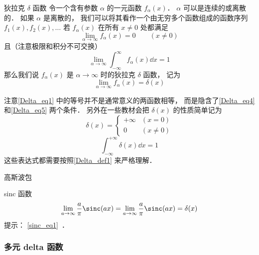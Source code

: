 \begin{definition}{狄拉克 $\delta$ 函数}\label{Delta_def1}
令一个含有参数 $\alpha$ 的一元函数 $f_\alpha(x)$． $\alpha$ 可以是连续的或离散的． 如果 $\alpha$ 是离散的， 我们可以将其看作一个由无穷多个函数组成的函数序列 $f_1(x), f_2(x), \dots$ 若 $f_\alpha(x)$ 在所有 $x \ne 0$ 处都满足
\begin{equation}\label{Delta_eq4}
\lim_{\alpha\to\infty} f_\alpha(x) = 0 \qquad (x \ne 0)
\end{equation}
且（注意极限和积分不可交换）
\begin{equation}\label{Delta_eq5}
\lim_{\alpha\to\infty} \int_{-\infty}^{\infty} f_\alpha(x) \dd{x} = 1
\end{equation}
那么我们说 $f_\alpha(x)$ 是 $\alpha\to\infty$ 时的狄拉克 $\delta$ 函数， 记为
\begin{equation}\label{Delta_eq1}
\lim_{\alpha\to\infty} f_\alpha(x) = \delta(x)
\end{equation}
\end{definition}
注意\autoref{Delta_eq1} 中的等号并不是通常意义的两函数相等， 而是隐含了\autoref{Delta_eq4} 和\autoref{Delta_eq5} 两个条件． 另外在一些教材会把 $\delta(x)$ 的性质简单记为
\begin{equation}\label{Delta_eq2}
\delta(x) =
\begin{cases}
+\infty & (x = 0)\\
0 & (x \ne 0)
\end{cases}
\end{equation}
\begin{equation}\label{Delta_eq3}
\int_{-\infty}^{+\infty} \delta(x) \dd{x} = 1
\end{equation}
这些表达式都需要按照\autoref{Delta_def1} 来严格理解．

\begin{example}{高斯波包}
\end{example}
\begin{exercise}{sinc 函数}
\begin{equation}
\lim_{a\to\infty}\frac{a}{\pi}\sinc(a x) = \lim_{a\to\infty}\frac{a}{\pi}\sinc(a x) = \delta(x)
\end{equation}
提示： \autoref{sinc_eq1}~．
\end{exercise}

\subsubsection{多元 delta 函数}

